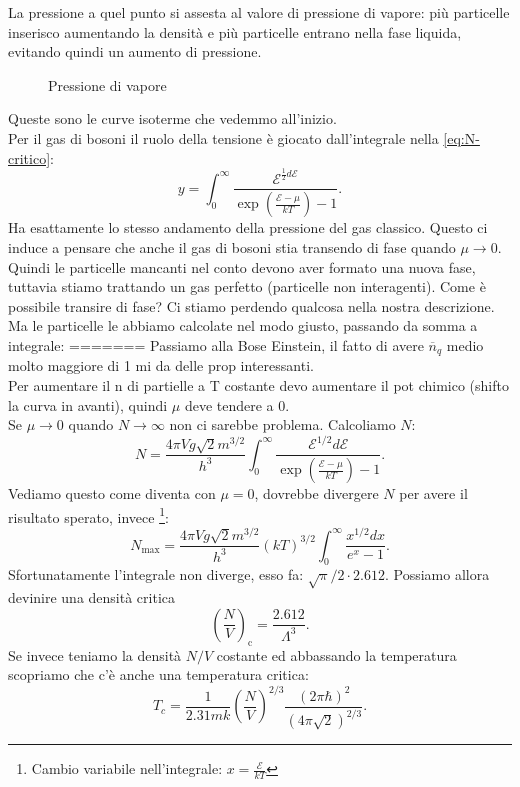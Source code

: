 La pressione a quel punto si assesta al valore di pressione di vapore: più particelle inserisco aumentando la densità e più particelle entrano nella fase liquida, evitando quindi un aumento di pressione.
\begin{figure}[H]
    \centering
    \caption{Pressione di vapore}
    \label{fig:pressione-di-vapore}
\end{figure}
\noindent
Queste sono le curve isoterme che vedemmo all'inizio.\\
Per il gas di bosoni il ruolo della tensione è giocato dall'integrale nella \ref{eq:N-critico}:
\[
	y =\int_{0}^{\infty} \frac{\mathcal{E} ^{\frac{1}{2}d\mathcal{E} }}{\exp\left( \frac{\mathcal{E} -\mu }{kT} \right)-1 } 
.\] 
Ha esattamente lo stesso andamento della pressione del gas classico. Questo ci induce a pensare che anche il gas di bosoni stia transendo di fase quando $\mu \to 0$.\\
Quindi le particelle mancanti nel conto devono aver formato una nuova fase, tuttavia stiamo trattando un gas perfetto (particelle non interagenti). Come è possibile transire di fase? Ci stiamo perdendo qualcosa nella nostra descrizione.\\
Ma le particelle le abbiamo calcolate nel modo giusto, passando da somma a integrale:
=======
Passiamo alla Bose Einstein, il fatto di avere $\overline{n}_{q}$ medio molto maggiore di 1 mi da delle prop interessanti. \\
Per aumentare il n di partielle a T costante devo aumentare il pot chimico (shifto la curva in avanti), quindi $\mu $ deve tendere a 0. \\
Se $\mu \to 0$ quando $N\to \infty$ non ci sarebbe problema. Calcoliamo $N$:
\[
	N = \frac{4\pi V g \sqrt{2} m ^{3 /2}}{h^3}\int_{0}^{\infty} \frac{\mathcal{E} ^{1 /2}d\mathcal{E} }{\exp\left( \frac{\mathcal{E} -\mu }{kT} \right) -1} 
.\] 
Vediamo questo come diventa con $\mu = 0$, dovrebbe divergere $N$ per avere il risultato sperato, invece \footnote{Cambio variabile nell'integrale: $x = \frac{\mathcal{E} }{kT}$}:
\[
	N_{\text{max}}= \frac{4\pi V g \sqrt{2} m ^{3 /2}}{h^3} \left( kT \right)^{3 /2} \int_{0}^{\infty} \frac{x^{1 /2}dx}{e^{x}-1} 
.\] 
Sfortunatamente l'integrale non diverge, esso fa: $ \sqrt{\pi} /2 \cdot 2.612$. Possiamo allora devinire una densità critica
\[
	\left( \frac{N}{V} \right)_{\text{c}}= \frac{2.612}{\Lambda ^3}
.\] 
Se invece teniamo la densità $N /V$ costante ed abbassando la temperatura scopriamo che c'è anche una temperatura critica:
\[
	T_{c} = \frac{1}{2.31 m k} \left( \frac{N}{V} \right)^{2 /3} \frac{\left( 2\pi \hbar  \right) ^2}{\left( 4\pi \sqrt{2}  \right) ^{2 /3}}
.\] 
